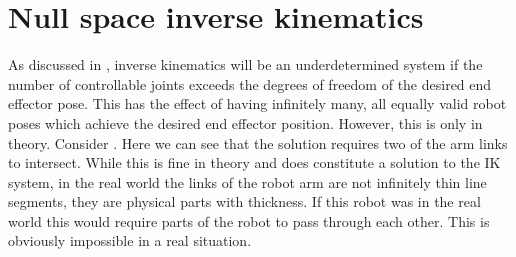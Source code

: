 \appendix
\chapter{Null space inverse kinematics}
\label{apx:null-space}
As discussed in , inverse kinematics will be an underdetermined system if the number of controllable joints exceeds the degrees of freedom of the desired end effector pose. This has the effect of having infinitely many, all equally valid robot poses which achieve the desired end effector position. However, this is only in theory. Consider . Here we can see that the solution requires two of the arm links to intersect. While this is fine in theory and does constitute a solution to the IK system, in the real world the links of the robot arm are not infinitely thin line segments, they are physical parts with thickness. If this robot was in the real world this would require parts of the robot to pass through each other. This is obviously impossible in a real situation.

